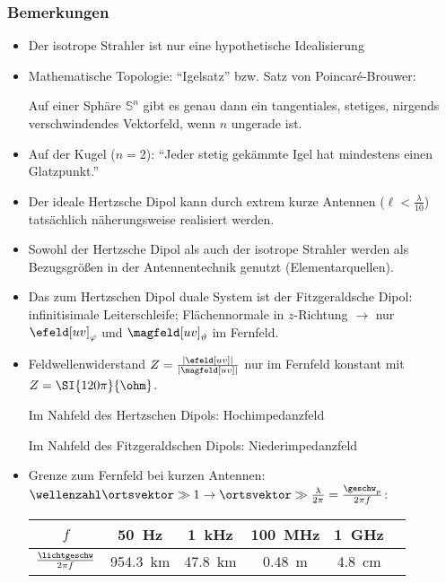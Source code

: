 \begin{frame}
  \frametitle{Bemerkungen}
  \begin{itemize}[<+->]
  \item Der \alert{isotrope Strahler} ist nur eine hypothetische Idealisierung
  \item Mathematische Topologie: \enquote{Igelsatz} bzw. Satz von Poincaré-Brouwer:

    Auf einer Sphäre \(\mathbb{S}^{n}\) gibt es genau dann ein tangentiales, stetiges, nirgends verschwindendes Vektorfeld, wenn \(n\) ungerade ist.

  \item Auf der Kugel (\(n=2\)): \alert{\enquote{Jeder stetig gekämmte Igel hat mindestens einen Glatzpunkt.}}
  \item Der ideale Hertzsche Dipol kann durch extrem kurze Antennen (\(\ell < \frac{\lambda}{10}\)) tatsächlich \alert{näherungsweise} realisiert werden.
  \item Sowohl der Hertzsche Dipol als auch der isotrope Strahler werden als Bezugsgrößen in der Antennentechnik genutzt (\alert{Elementarquellen}).
  \item Das zum Hertzschen Dipol \alert{duale} System ist der \alert{Fitzgeraldsche Dipol}: infinitisimale Leiterschleife; Flächennormale in \(z\)-Richtung \(\to\) nur \(\efeld[uv]_\varphi\) und \(\magfeld[uv]_\vartheta\) im Fernfeld.
  \item Feldwellenwiderstand \(Z=\frac{|\efeld[uv]|}{|\magfeld[uv]|}\) nur im Fernfeld konstant mit \(Z=\SI{120\pi}{\ohm}\).

    Im Nahfeld des Hertzschen Dipols: \alert{Hochimpedanzfeld}

    Im Nahfeld des Fitzgeraldschen Dipols: \alert{Niederimpedanzfeld}
  \item \alert{Grenze zum Fernfeld} bei kurzen Antennen: \(\wellenzahl \ortsvektor \gg 1 \to \ortsvektor \gg  \frac{\lambda}{2\pi} = \frac{\geschw_p}{2\pi f}\):
    \begin{tabular}{c||c|c|c|c|c}
      $f$ & \SI{50}{\hertz} & \SI{1}{\kilo\hertz} & \SI{100}{\mega\hertz}& \SI{1}{\giga\hertz}\\
      \hline
      $\frac{\lichtgeschw}{2\pi f}$ & \SI{954.3}{\kilo\metre} & \SI{47.8}{\kilo\metre} &\SI{0.48}{\metre} &\SI{4.8}{\centi\metre}
    \end{tabular}
  \end{itemize}
  \ 
  \end{frame}


